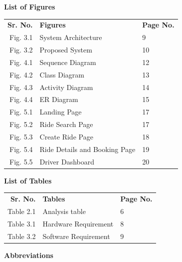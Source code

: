 \documentclass[12pt,a4paper]{article}
\newcommand{\pageheading}[1]{%
  \begin{center}
    {\Large\bfseries #1}
  \end{center}
  \vspace{0.55cm}}
\begin{document}
\clearpage
\pageheading{List of Figures}

\begin{tabularx}{\textwidth}{@{}N >{\centering\arraybackslash}X P@{}}
\textbf{Sr. No.} & \textbf{Figures} & \textbf{Page No.}\\[0.4em]
Fig. 3.1 & System Architecture & 9\\[0.4em]
Fig. 3.2 & Proposed System & 10\\[0.4em]
Fig. 4.1 & Sequence Diagram & 12\\[0.4em]
Fig. 4.2 & Class Diagram & 13\\[0.4em]
Fig. 4.3 & Activity Diagram & 14\\[0.4em]
Fig. 4.4 & ER Diagram & 15\\[0.4em]
Fig. 5.1 & Landing Page & 17\\[0.4em]
Fig. 5.2 & Ride Search Page & 17\\[0.4em]
Fig. 5.3 & Create Ride Page & 18\\[0.4em]
Fig. 5.4 & Ride Details and Booking Page & 19\\[0.4em]
Fig. 5.5 & Driver Dashboard & 20\\
\end{tabularx}

\clearpage
\pageheading{List of Tables}

\begin{tabularx}{\textwidth}{@{}N >{\centering\arraybackslash}X P@{}}
\textbf{Sr. No.} & \textbf{Tables} & \textbf{Page No.}\\[0.4em]
Table 2.1 & Analysis table & 6\\[0.4em]
Table 3.1 & Hardware Requirement & 8\\[0.4em]
Table 3.2 & Software Requirement & 9\\
\end{tabularx}

\clearpage
\pageheading{Abbreviations}
\end{document}
